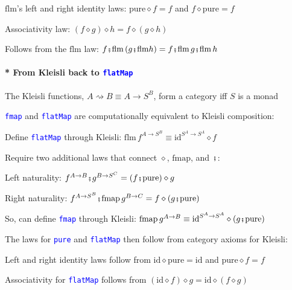 $\text{flm}$'s left and right identity laws: $\text{pure}\diamond f=f$
and $f\diamond\text{pure}=f$

Associativity law: $\left(f\diamond g\right)\diamond h=f\diamond\left(g\diamond h\right)$

Follows from the $\text{flm}$ law: $f\bef\text{flm}\left(g\bef\text{flm}h\right)=f\bef\text{flm}\,g\bef\text{flm}\,h$

\paragraph{{*} From Kleisli back to \texttt{\textcolor{blue}{\footnotesize{}flatMap}} }

The Kleisli functions, $A\rightsquigarrow B\equiv A\rightarrow S^{B}$,
form a category iff $S$ is a monad 

\texttt{\textcolor{blue}{\footnotesize{}fmap}} and \texttt{\textcolor{blue}{\footnotesize{}flatMap}}
are computationally equivalent to Kleisli composition:

Define \texttt{\textcolor{blue}{\footnotesize{}flatMap}} through Kleisli:{\small{}
$\text{flm}\,f^{A\rightarrow S^{B}}\equiv\text{id}^{S^{A}\rightarrow S^{A}}\diamond f$}{\small\par}

Require two additional laws that connect $\diamond$, $\text{fmap}$,
and $\bef$:

Left naturality: {\small{}$f^{A\rightarrow B}\bef g^{B\rightarrow S^{C}}=\left(f\bef\text{pure}\right)\diamond g$}{\small\par}

Right naturality: {\small{}$f^{A\rightarrow S^{B}}\bef\text{fmap}\,g^{B\rightarrow C}=f\diamond\left(g\bef\text{pure}\right)$}{\small\par}

So, can define \texttt{\textcolor{blue}{\footnotesize{}fmap}} through
Kleisli: $\text{fmap}\,g^{A\rightarrow B}\equiv\text{id}^{S^{A}\rightarrow S^{A}}\diamond\left(g\bef\text{pure}\right)$

The laws for \texttt{\textcolor{blue}{\footnotesize{}pure}} and \texttt{\textcolor{blue}{\footnotesize{}flatMap}}
then follow from category axioms for Kleisli:

Left and right identity laws follow from $\text{id}\diamond\text{pure}=\text{id}$
and $\text{pure}\diamond f=f$ 

Associativity for \texttt{\textcolor{blue}{\footnotesize{}flatMap}}
follows from $\left(\text{id}\diamond f\right)\diamond g=\text{id}\diamond\left(f\diamond g\right)$

